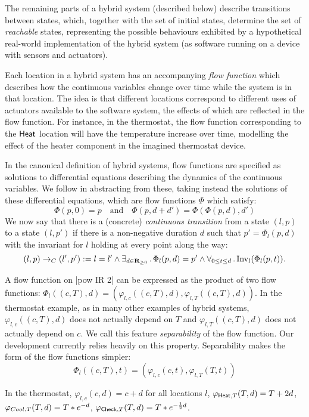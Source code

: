 \documentclass[runningheads]{llncs}
\newcommand{\Exists}[2]{\exists_{#1} \, . \, #2}
\newcommand{\Forall}[2]{\forall_{#1} \, . \, #2}
\def\phi{\varphi}
\newcommand{\IR}{{\mathbf R}}
\newcommand{\Heat}{{\sf Heat}}
\newcommand{\Cool}{{\sf Cool}}
\newcommand{\Chec}{{\sf Check}}
\newcommand{\Inv}{{\rm Inv}}
\newcommand{\contrans}{\rightarrow_C}
\newcommand{\Dur}{{\IR_{\geq 0}}}
\begin{document}

The remaining parts of a hybrid system (described below) describe transitions between states, which, together
with the set of initial states, determine the set of \emph{reachable}
states, representing the possible behaviours exhibited by a
hypothetical real-world implementation of the hybrid system (as
software running on a device with sensors and actuators).

Each location in a hybrid system has an accompanying \emph{flow function} which describes how the continuous variables change over
time while the system is in that location. The idea is that different locations correspond to different uses of actuators
available to the software system, the effects of which are reflected in the flow function. For instance, in the thermostat, the flow
function corresponding to the $\Heat$ location will have the
temperature increase over time, modelling the effect of the heater
component in the imagined thermostat device.

In the canonical definition of hybrid systems, flow functions are
specified as solutions to differential equations describing the
dynamics of the continuous variables. We follow \cite{alur} in
abstracting from these, taking instead the solutions of these
differential equations, which are flow functions $\Phi$ which satisfy:
$$\Phi(p, 0) = p \quad \mbox{and} \quad \Phi (p, d + d') = \Phi (\Phi(p, d), d')$$
We now say that there is a (concrete) \emph{continuous transition}
from a state $(l, p)$ to a state $(l, p')$ if there is a
non-negative duration $d$ such that $p' = \Phi_l(p,d)$ with the
invariant for $l$ holding at every point along the way:
$$ (l,p) \contrans (l',p') := l = l' \wedge \Exists{d\in
\Dur}{\Phi_l(p, d) = p' \wedge \Forall{0 \leq t\leq d}{\Inv_l(\Phi_l (p, t))}}.$$

A flow function on |pow IR 2| can be expressed as the
product of two flow functions: $\Phi_l((c,T),d) = (\phi_{l,c}((c,T),d),
\phi_{l,T}((c,T),d))$. In the thermostat example, as in many other
examples of hybrid systems, $\phi_{l,c}((c,T),d)$ does not actually depend on $T$
and $\phi_{l,T}((c,T),d)$ does not actually depend on $c$. We call this feature
{\em separability\/} of the flow function. Our development currently
relies heavily on this property. Separability makes the form of the
flow functions simpler:
$$\Phi_l((c,T),t) = (\phi_{l,c}(c,t), \phi_{l,T}(T,t))$$

In the thermostat, $\phi_{l,c}(c,d) = c + d$ for all locations $l$, $\phi_{\Heat,T}(T,d)= T + 2 d$,
$\phi_{\\Cool,T}(T,d)= T * e^{-d}$, $\phi_{\Chec,T}(T,d)= T * e^{- \frac{1}{2}d}$.
\end{document}
